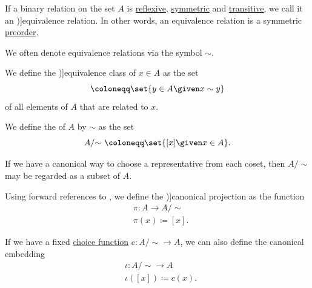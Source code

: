 \begin{comments}
\begin{definition}\label{def:equivalence_relation}
  If a binary relation on the set \( A \) is \hyperref[def:binary_relation/reflexive]{reflexive}, \hyperref[def:binary_relation/symmetric]{symmetric} and \hyperref[def:binary_relation/transitive]{transitive}, we call it an \term[ru=отношение эквивалентности (\cite[66]{БелоусовТкачёв2004ДискретнаяМатематика})]{equivalence relation}. In other words, an equivalence relation is a symmetric \hyperref[def:preordered_set]{preorder}.

  We often denote equivalence relations via the symbol \( \sim \).

  \begin{thmenum}
     We define the \term[ru=класс эквивалентности (\cite[70]{БелоусовТкачёв2004ДискретнаяМатематика})]{equivalence class} of \( x \in A \) as the set
    \begin{equation*}
      [x] \coloneqq \set{ y \in A \given x \sim y }
    \end{equation*}
    of all elements of \( A \) that are related to \( x \).

     We define the  of \( A \) by \( \sim \) as the set
    \begin{equation*}
      A / {\sim} \ \coloneqq \set{ [x] \given x \in A }.
    \end{equation*}

    If we have a canonical way to choose a representative from each coset, then \( A / {\sim} \) may be regarded as a subset of \( A \).

    \mimprovised Using forward references to , we define the \term[en=canonical projection (\cite[example 2.6]{Aluffi2009Algebra})]{canonical projection} as the function
    \begin{equation*}
      \begin{aligned}
        &\pi: A \to A / {\sim}  \\
        &\pi(x) \coloneqq [x].
      \end{aligned}
    \end{equation*}

    If we have a fixed \hyperref[def:choice_function]{choice function} \( c: A / {\sim} \to A \), we can also define the canonical embedding
    \begin{equation*}
      \begin{aligned}
        &\iota: A / {\sim} \to A \\
        &\iota([x]) \coloneqq c(x).
      \end{aligned}
    \end{equation*}


\end{thmenum}
\end{definition}
\end{comments}
